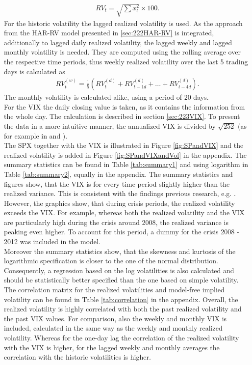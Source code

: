 \begin{align}
RV_{t} = \sqrt{\sum x_{t}^{2}} \times 100.
\end{align}
For the historic volatility the lagged realized volatility is used. As the approach from the HAR-RV model presented in \ref{sec:222HAR-RV} is integrated, additionally to lagged daily realized volatility, the lagged weekly and lagged monthly volatility is needed. They are computed using the rolling average over the respective time periods, thus weekly realized volatility over the last 5 trading days is calculated as
\begin{align}
RV_{t}^{(w)} = \frac{1}{5} (RV_{t}^{(d)} + RV_{t-1d}^{(d)} + ... + RV_{t-4d}^{(d)}).
\end{align}
The monthly volatility is calculated alike, using a period of 20 days.\\
For the \ac{VIX} the daily closing value is taken, as it contains the information from the whole day. The calculation is described in section \ref{sec:223VIX}. To present the data in a more intuitive manner, the annualized \ac{VIX} is divided by $\sqrt{252}$ (as for example in \textcite{blair2001} and \textcite{whaley2008}).\\
The \ac{SPX} together with the \ac{VIX} is illustrated in Figure \ref{fig:SPandVIX} and the realized volatility is added in Figure \ref{fig:SPandVIXandVol} in the appendix. The summary statistics can be found in Table \ref{tab:summary1} and using logarithm in Table \ref{tab:summary2}, equally in the appendix. The summary statistics and figures show, that the \ac{VIX} is for every time period slightly higher than the realized variance. This is consistent with the findings previous research, e.g. \textcite{jiang2003}. However, the graphics show, that during crisis periods, the realized volatility exceeds the \ac{VIX}. For example, whereas both the realized volatility and the \ac{VIX} are particularly high during the crisis around 2008, the realized variance is peaking even higher. To account for this period, a dummy for the crisis 2008 - 2012 was included in the model.\\
Moreover the summary statistics show, that the skewness and kurtosis of the logarithmic specification is closer to the one of the normal distribution. Consequently, a regression based on the log volatilities is also calculated and should be statistically better specified than the one based on simple volatility.\\
The correlation matrix for the realized volatilities and model-free implied volatility can be found in Table \ref{tab:correlation} in the appendix. Overall, the realized volatility is highly correlated with both the past realized volatility and the past \ac{VIX} values. For comparison, also the weekly and monthly \ac{VIX} is included, calculated in the same way as the weekly and monthly realized volatility. Whereas for the one-day lag the correlation of the realized volatility with the \ac{VIX} is higher, for the lagged weekly and monthly averages the correlation with the historic volatilities is higher. 

